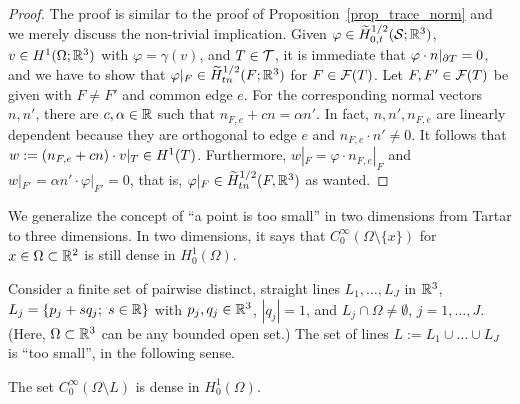 \documentclass[11pt]{article}
\begin{document}
\begin{proof}
The proof is similar to the proof of Proposition~\ref{prop_trace_norm} and
we merely discuss the non-trivial implication.
Given $\varphi\in \widetilde H^{1/2}_{0,t}(\mathcal{S};\mathbb{R}^3)$, $v\in H^1(\Omega;\mathbb{R}^3)$ with $\varphi=\gamma(v)$,
and $T\in\mathcal{T}$, it is immediate that $\varphi\cdot n|_{\partial T}=0$,
and we have to show that $\varphi|_F\in \widetilde H^{1/2}_{tn}(F;\mathbb{R}^3)$ for $F\in\mathcal{F}(T)$.
Let $F,F'\in\mathcal{F}(T)$ be given with $F\not= F'$ and common edge $e$. For the corresponding
normal vectors $n,n'$, there are $c,\alpha\in\mathbb{R}$ such that $n_{F,e}+c n=\alpha n'$.
In fact, $n,n',n_{F,e}$ are linearly dependent because
they are orthogonal to edge $e$ and $n_{F,e}\cdot n'\not=0$.
It follows that $w:=(n_{F,e}+cn)\cdot v|_T\in H^1(T)$.
Furthermore, $w|_F=\varphi\cdot n_{F,e}|_F$ and $w|_{F'}=\alpha n'\cdot\varphi|_{F'}=0$,
that is, $\varphi|_F\in \widetilde H^{1/2}_{tn}(F,\mathbb{R}^3)$ as wanted.
\end{proof}

We generalize the concept of ``a point is too small'' in two dimensions from
Tartar \cite[\S 17]{Tartar_07_ISS} to three dimensions. In two dimensions,
it says that $C_0^\infty(\Omega\setminus\{x\})$ for $x\in\Omega\subset\mathbb{R}^2$
is still dense in $H^1_0(\Omega)$.

Consider a finite set of pairwise distinct, straight lines $L_1,\ldots,L_J$ in $\mathbb{R}^3$,
$L_j=\{p_j+s q_j;\;s\in\mathbb{R}\}$ with $p_j,q_j\in\mathbb{R}^3$, $|q_j|=1$,
and $L_j\cap\Omega\not=\emptyset$, $j=1,\ldots,J$.
(Here, $\Omega\subset\mathbb{R}^3$ can be any bounded open set.)
The set of lines
\(
   L:=L_1\cup\ldots \cup L_J
\)
is ``too small'', in the following sense.

\begin{prop}[density] \label{prop_Tartar}
The set $C_0^\infty(\Omega\setminus L)$ is dense in $H^1_0(\Omega)$.
\end{prop}
\end{document}
